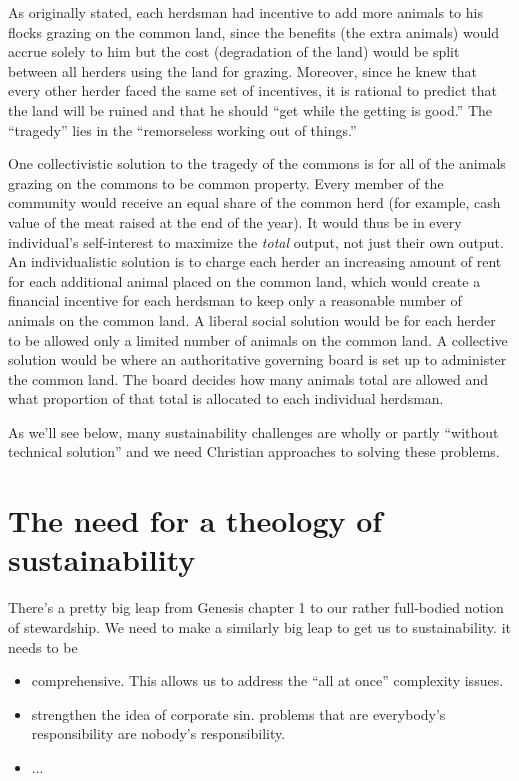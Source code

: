 \documentclass[12pt]{article}
\begin{document}
As originally stated, each herdsman had incentive to add more animals to his flocks grazing on the common land, since
the benefits (the extra animals) would accrue solely to him but the cost (degradation of the land) would be split between
all herders using the land for grazing. Moreover, since he knew that every other herder faced the same set of
incentives, it is rational to predict that the land will be ruined and that he should ``get while the getting is good.''
The ``tragedy'' lies in the ``remorseless working out of things.''

One collectivistic solution to the tragedy of the commons is for all of the animals grazing on the commons to be common
property. Every member of the community would receive an equal share of the common herd (for example, cash value of the
meat raised at the end of the year). It would thus be in every individual's self-interest to maximize the \emph{total}
output, not just their own output. An individualistic solution is to charge each herder an increasing amount of rent for
each additional animal placed on the common land, which would create a financial incentive for each herdsman to keep
only a reasonable number of animals on the common land. A liberal social solution would be for each herder to be allowed
only a limited number of animals on the common land. A collective solution would be where an authoritative governing
board is set up to administer the common land. The board decides how many animals total are allowed and what proportion
of that total is allocated to each individual herdsman.

As we'll see below, many sustainability challenges are wholly or partly ``without technical solution'' and we need
Christian approaches to solving these problems.




\section{The need for a theology of sustainability}
\label{sec:need_for_theology_of_sustainability}

There's a pretty big leap from Genesis chapter 1 to our rather full-bodied notion of stewardship.
We need to make a similarly big leap to get us to sustainability.
it needs to be 
\begin{itemize}
\item comprehensive. This allows us to address the ``all at once'' complexity issues. 
\item strengthen the idea of corporate sin. problems that are everybody's responsibility are nobody's responsibility.
\item ...
\end{itemize}
\end{document}
